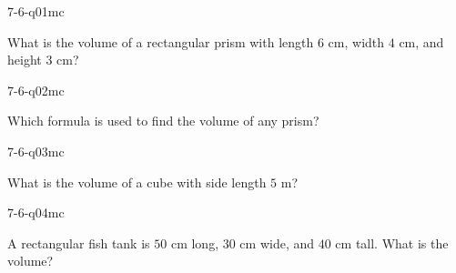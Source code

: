 

\begin{practiceQuestion}{7-6-q01}{mc}
\begin{questionText}
What is the volume of a rectangular prism with length $6$ cm, width $4$ cm, and height $3$ cm?
\end{questionText}
\end{practiceQuestion}

\begin{practiceQuestion}{7-6-q02}{mc}
\begin{questionText}
Which formula is used to find the volume of any prism?
\end{questionText}
\end{practiceQuestion}

\begin{practiceQuestion}{7-6-q03}{mc}
\begin{questionText}
What is the volume of a cube with side length $5$ m?
\end{questionText}
\end{practiceQuestion}

\begin{practiceQuestion}{7-6-q04}{mc}
\begin{questionText}
A rectangular fish tank is $50$ cm long, $30$ cm wide, and $40$ cm tall. What is the volume?
\end{questionText}
\end{practiceQuestion}

